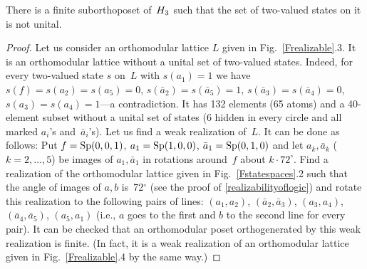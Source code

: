 \begin {proposition} \label{nounital}
There is a finite suborthoposet of~$H_3$ such that the set of two-valued
states on it is not unital.
\end {proposition}


\begin {proof}
Let us consider an orthomodular lattice $L$ given in
Fig.~\ref{Frealizable}.3. It is an orthomodular lattice without a unital set
of two-valued states. Indeed, for every two-valued state $s$ on~$L$ with
$s(a_1)=1$ we have $s(f)=s(a_2)=s(a_5)=0$, $s(\bar a_2)=s(\bar a_5)=1$,
$s(\bar a_3)=s(\bar a_4)=0$, $s(a_3)=s(a_4)=1$---a contradiction. It has 132
elements (65 atoms) and a 40-element subset without a unital set of states
(6 hidden in every circle and all marked $a_i$'s and~$\bar a_i$'s). Let us
find a weak realization of~$L$. It can be done as follows: Put
$f={\rm Sp}(0,0,1)$, $a_1={\rm Sp}(1,0,0)$, $\bar a_1={\rm Sp}(0,1,0)$ and let $a_k,\bar
a_k$ ($k=2,\ldots,5$) be images of $a_1,\bar a_1$ in rotations around~$f$
about $k\cdot 72^\circ$. Find a realization of the orthomodular lattice
given in Fig.~\ref{Fstatespaces}.2 such that the angle of images of $a,b$
is~72$^\circ$ (see the proof of \ref{realizabilityoflogic}) and rotate this
realization to the following pairs of lines: $(a_1,a_2)$, $(\bar a_2,\bar
a_3)$, $(a_3,a_4)$, $(\bar a_4,\bar a_5)$, $(a_5,a_1)$ (i.e., $a$ goes to
the first and $b$ to the second line for every pair). It can be checked that
an orthomodular poset orthogenerated by this weak realization is finite. (In
fact, it is a weak realization of an orthomodular lattice given in
Fig.~\ref{Frealizable}.4 by the same way.)
\end {proof}


